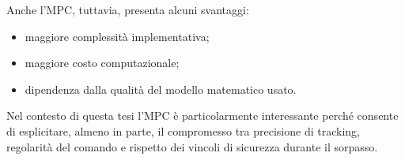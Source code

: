Anche l'MPC, tuttavia, presenta alcuni svantaggi:

\begin{itemize}
    \item maggiore complessità implementativa;
    \item maggiore costo computazionale;
    \item dipendenza dalla qualità del modello matematico usato.
\end{itemize}

Nel contesto di questa tesi l'MPC è particolarmente interessante perché consente di esplicitare, almeno in parte, il compromesso tra precisione di tracking, regolarità del comando e rispetto dei vincoli di sicurezza durante il sorpasso.
